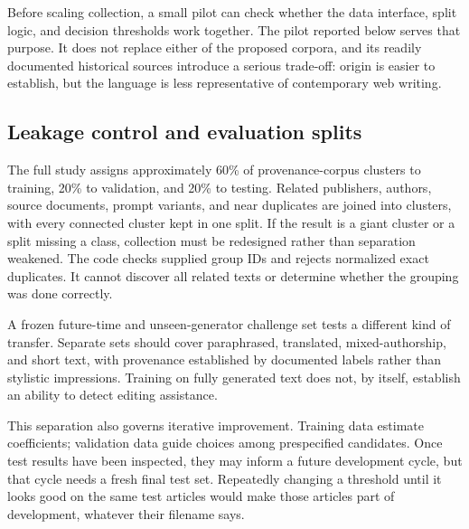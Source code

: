 \documentclass[11pt]{article}
\begin{document}
Before scaling collection, a small pilot can check whether the data interface,
split logic, and decision thresholds work together. The pilot reported below
serves that purpose. It does not replace either of the proposed corpora, and
its readily documented historical sources introduce a serious trade-off:
origin is easier to establish, but the language is less representative of
contemporary web writing.

\subsection{Leakage control and evaluation splits}
The full study assigns approximately 60\% of provenance-corpus clusters to
training, 20\% to validation, and 20\% to testing. Related publishers, authors,
source documents, prompt variants, and near duplicates are joined into
clusters, with every connected cluster kept in one split. If the result is
a giant cluster or a split missing a class, collection must be redesigned
rather than separation weakened. The code checks supplied group IDs and
rejects normalized exact duplicates. It cannot discover all related texts
or determine whether the grouping was done correctly.

A frozen future-time and unseen-generator challenge set tests a different
kind of transfer. Separate sets should cover paraphrased, translated,
mixed-authorship, and short text, with provenance established by documented
labels rather than stylistic impressions. Training on fully generated text
does not, by itself, establish an ability to detect editing assistance.

This separation also governs iterative improvement. Training data estimate
coefficients; validation data guide choices among prespecified candidates.
Once test results have been inspected, they may inform a future development
cycle, but that cycle needs a fresh final test set. Repeatedly changing a
threshold until it looks good on the same test articles would make those
articles part of development, whatever their filename says.
\end{document}
